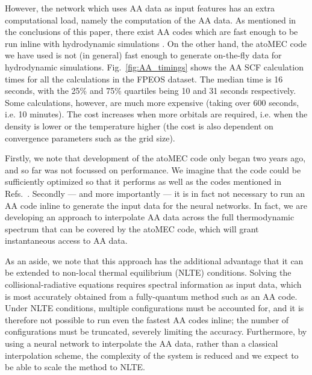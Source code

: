 \documentclass[%
 preprint,
 superscriptaddress,
 amsmath,amssymb,
longbibliography,
]{revtex4-2}
\begin{document}
However, the network which uses AA data as input features has an extra computational load, namely the computation of the AA data. As mentioned in the conclusions of this paper, there exist AA codes which are fast enough to be run inline with hydrodynamic simulations \cite{Massacrier_bands_2021, Hansen_fast_AA, XSN_ref_2}. On the other hand, the atoMEC code we have used is not (in general) fast enough to generate on-the-fly data for hydrodynamic simulations. Fig.~\ref{fig:AA_timings} shows the AA SCF calculation times for all the calculations in the FPEOS dataset. The median time is 16 seconds, with the 25\% and 75\% quartiles being 10 and 31 seconds respectively. Some calculations, however, are much more expensive (taking over 600 seconds, i.e. 10 minutes). The cost increases when more orbitals are required, i.e. when the density is lower or the temperature higher (the cost is also dependent on convergence parameters such as the grid size). 

Firstly, we note that development of the atoMEC code only began two years ago, and so far was not focussed on performance. We imagine that the code could be sufficiently optimized so that it performs as well as the codes mentioned in Refs.~\cite{Massacrier_bands_2021, XSN_ref_2}. Secondly --- and more importantly --- it is in fact not necessary to run an AA code inline to generate the input data for the neural networks. In fact, we are developing an approach to interpolate AA data across the full thermodynamic spectrum that can be covered by the atoMEC code, which will grant instantaneous access to AA data. 

As an aside, we note that this approach has the additional advantage that it can be extended to non-local thermal equilibrium (NLTE) conditions. Solving the collisional-radiative equations requires spectral information as input data, which is most accurately obtained from a fully-quantum method such as an AA code. Under NLTE conditions, multiple configurations must be accounted for, and it is therefore not possible to run even the fastest AA codes inline; the number of configurations must be truncated, severely limiting the accuracy. Furthermore, by using a neural network to interpolate the AA data, rather than a classical interpolation scheme, the complexity of the system is reduced and we expect to be able to scale the method to NLTE.
\end{document}
